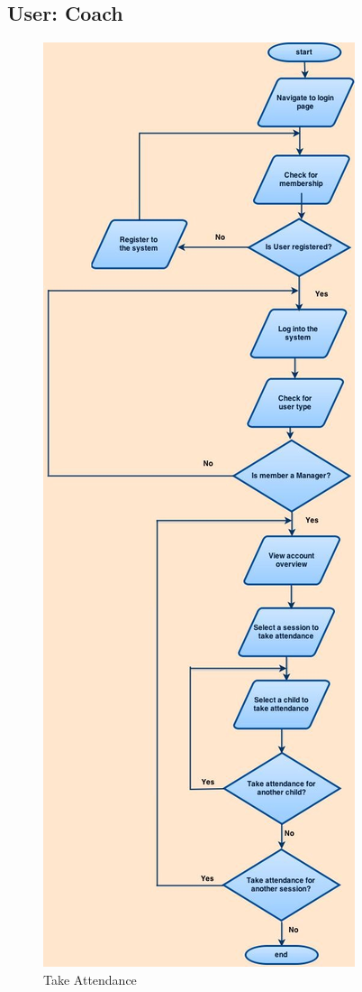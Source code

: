 \documentclass{l3proj}
\begin{document}
\subsection{User: Coach}
{
\begin{figure}[h]
\caption{Take Attendance}
\centering
\includegraphics[scale=0.30]{Coach(TakeAttendance).jpg}
\end{figure}
}
\end{document}
